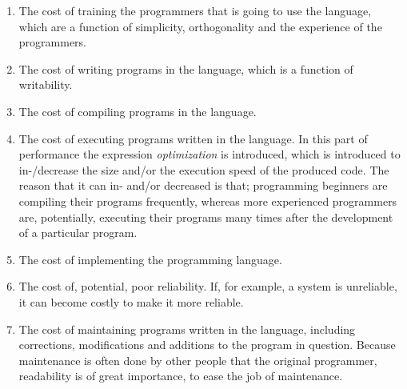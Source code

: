 \begin{enumerate}
	\item The cost of training the programmers that is going to use the language, which are a function of simplicity, orthogonality and the experience of the programmers.
	\item The cost of writing programs in the language, which is a function of writability.
	\item The cost of compiling programs in the language.
	\item The cost of executing programs written in the language. In this part of performance the expression \textit{optimization} is introduced, which is introduced to in-/decrease the size and/or the execution speed of the produced code. The reason that it can in- and/or decreased is that; programming beginners are compiling their programs frequently, whereas more experienced programmers are, potentially, executing their programs many times after the development of a particular program.
	\item The cost of implementing the programming language.
	\item The cost of, potential, poor reliability. If, for example, a system is unreliable, it can become costly to make it more reliable.
	\item The cost of maintaining programs written in the language, including corrections, modifications and additions to the program in question. Because maintenance is often done by other people that the original programmer, readability is of great importance, to ease the job of maintenance.
\end{enumerate}

